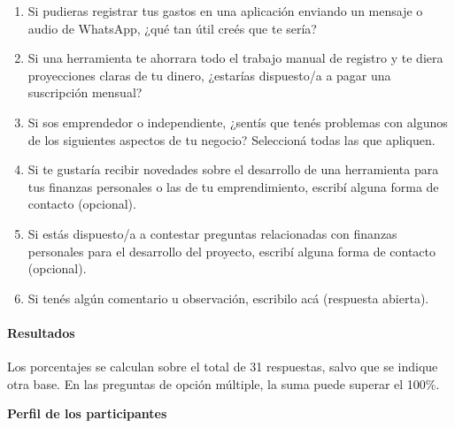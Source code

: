 \begin{enumerate}
  ¿Utilizás herramientas de inteligencia artificial con tal de mejorar
  en el seguimiento y control de tus finanzas? ¿Usarías?
\item
  Si pudieras registrar tus gastos en una aplicación enviando un mensaje
  o audio de WhatsApp, ¿qué tan útil creés que te sería?
\item
  Si una herramienta te ahorrara todo el trabajo manual de registro y te
  diera proyecciones claras de tu dinero, ¿estarías dispuesto/a a pagar
  una suscripción mensual?
\item
  Si sos emprendedor o independiente, ¿sentís que tenés problemas con
  algunos de los siguientes aspectos de tu negocio? Seleccioná todas las
  que apliquen.
\item
  Si te gustaría recibir novedades sobre el desarrollo de una
  herramienta para tus finanzas personales o las de tu emprendimiento,
  escribí alguna forma de contacto (opcional).
\item
  Si estás dispuesto/a a contestar preguntas relacionadas con finanzas
  personales para el desarrollo del proyecto, escribí alguna forma de
  contacto (opcional).
\item
  Si tenés algún comentario u observación, escribilo acá (respuesta
  abierta).
\end{enumerate}

\paragraph*{Resultados}\label{resultados}

Los porcentajes se calculan sobre el total de 31 respuestas, salvo que
se indique otra base. En las preguntas de opción múltiple, la suma puede
superar el 100\%.

\textbf{Perfil de los participantes}

